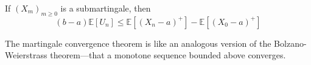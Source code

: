 	\begin{theorem}
		If $(X_m)_{m \geq 0}$ is a submartingale, then 
		\begin{equation}
			(b - a) \mathbb{E}[U_n] \leq \mathbb{E}[(X_n - a)^+] - \mathbb{E}[(X_0 - a)^+]
		\end{equation}
	\end{theorem}

	The martingale convergence theorem is like an analogous version of the Bolzano-Weierstrass theorem---that a monotone sequence bounded above converges. 

